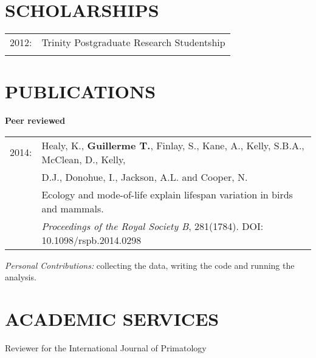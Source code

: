 \documentclass[10pt,a4paper]{article}
\begin{document}
{\section{SCHOLARSHIPS}
\begin{tabular}{ll}
2012: & Trinity Postgraduate Research Studentship\\
& \\ 
\end{tabular}
\bigskip

\section{PUBLICATIONS}
\raggedright\textbf{Peer reviewed}\\[1.5ex]
\begin{tabular}{ll}
2014: & Healy, K., \textbf{Guillerme T.}, Finlay, S., Kane, A., Kelly, S.B.A., McClean, D., Kelly, \\
& D.J., Donohue, I., Jackson, A.L. and Cooper, N. \\
& Ecology and mode-of-life explain lifespan variation in birds and mammals.\\
& \textit{Proceedings of the Royal Society B}, 281(1784). DOI: 10.1098/rspb.2014.0298\\ [1.5ex]
\end{tabular}
\bigskip
\textit{Personal Contributions:} collecting the data, writing the code and running the analysis.
\bigskip

\section{ACADEMIC SERVICES}
Reviewer for the International Journal of Primatology
\bigskip

}
\end{document}
